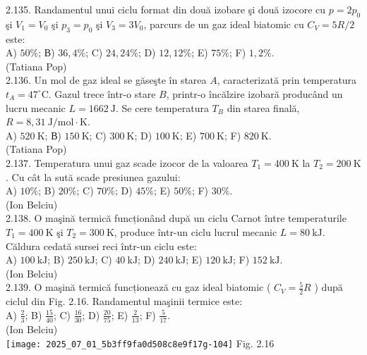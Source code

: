 2.135. Randamentul unui ciclu format din două izobare şi două izocore cu $p=2 p_{0}$ şi $V_{1}=V_{0}$ şi $p_{3}=p_{0}$ şi $V_{3}=3 V_{0}$, parcurs de un gaz ideal biatomic cu $C_{V}=5 R / 2$ este:\\ A) $50 \%$; В) $36,4 \%$; C) $24,24 \%$; D) $12,12 \%$; E) $75 \%$; F) $1,2 \%$.\\ (Tatiana Pop)\\

2.136. Un mol de gaz ideal se găseşte în starea $A$, caracterizată prin temperatura $t_{A}=47^{\circ} \mathrm{C}$. Gazul trece într-o stare $B$, printr-o încălzire izobară producând un lucru mecanic $L=1662 \mathrm{~J}$. Se cere temperatura $T_{B}$ din starea finală, $R=8,31 \mathrm{~J} / \mathrm{mol} \cdot \mathrm{K}$.\\ A) $520 \mathrm{~K}$; В) $150 \mathrm{~K}$; C) $300 \mathrm{~K}$; D) $100 \mathrm{~K}$; E) $700 \mathrm{~K}$; F) $820 \mathrm{~K}$.\\ (Tatiana Pop)\\

2.137. Temperatura unui gaz scade izocor de la valoarea $T_{1}=400 \mathrm{~K}$ la $T_{2}=200 \mathrm{~K}$. Cu cât la sută scade presiunea gazului:\\ A) $10 \%$; B) $20 \%$; C) $70 \%$; D) $45 \%$; E) $50 \%$; F) $30 \%$.\\ (Ion Belciu)\\

2.138. O maşină termică funcționând după un ciclu Carnot între temperaturile $T_{1}=400 \mathrm{~K}$ şi $T_{2}=300 \mathrm{~K}$, produce într-un ciclu lucrul mecanic $L=80 \mathrm{~kJ}$. Căldura cedată sursei reci într-un ciclu este:\\ A) $100 \mathrm{~kJ}$; B) $250 \mathrm{~kJ}$; C) $40 \mathrm{~kJ}$; D) $240 \mathrm{~kJ}$; E) $120 \mathrm{~kJ}$; F) $152 \mathrm{~kJ}$.\\ (Ion Belciu)\\

2.139. O maşină termică funcționează cu gaz ideal biatomic ( $C_{V}=\frac{5}{2} R$ ) după ciclul din Fig. 2.16. Randamentul maşinii termice este:\\ A) $\frac{2}{3}$; B) $\frac{15}{40}$; C) $\frac{16}{30}$; D) $\frac{20}{75}$; E) $\frac{2}{13}$; F) $\frac{5}{17}$.\\ (Ion Belciu)\\ \texttt{[image: 2025\_07\_01\_5b3ff9fa0d508c8e9f17g-104]} Fig. 2.16\\


